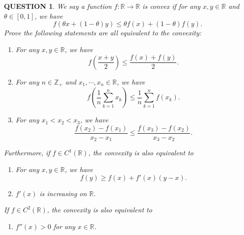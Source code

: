 \documentclass[12pt]{article}
\renewcommand{\(}{\left(}%
\renewcommand{\)}{\right)}%
\renewcommand{\[}{\left[}%
\renewcommand{\]}{\right]}%
\renewcommand{\r}{\mathbb{R}}
\newcommand{\z}{\mathbb{Z}}
\newtheorem{question}{QUESTION}[section]}
\begin{document}
\begin{question}
	We say a function $f:\r\to\r$ is convex if for any $x,y\in\r$ and $\theta\in[0,1]$, we have
	\begin{equation*}
		f(\theta x+(1-\theta)y)\leq \theta f(x)+(1-\theta)f(y).\tag{$*$}
	\end{equation*}
	Prove the following statements are all equivalent to the convexity:
	\begin{enumerate}
		\item For any $x,y\in\r$, we have
		\begin{equation*}
			f\(\frac{x+y}{2} \)\leq \frac{f(x)+f(y)}{2}.
		\end{equation*}
		\item For any $n\in\z_+$ and $x_1,\cdots,x_n\in\r$, we have
		\begin{equation*}
			f\(\frac{1}{n}\sum_{k=1}^nx_k \)\leq \frac{1}{n}\sum_{k=1}^nf(x_k).\tag{$*$}
		\end{equation*}
		\item For any $x_1<x_2<x_3$, we have
		\begin{equation*}
			\frac{f(x_2)-f(x_1)}{x_2-x_1}\leq \frac{f(x_3)-f(x_2)}{x_3-x_2}.
		\end{equation*}
		
	\end{enumerate}
	Furthermore, if $f\in C^1(\r)$, the convexity is also equivalent to
	\begin{enumerate}
		\item[4.]For any $x,y\in\r$, we have
		\begin{equation*}
			f(y)\geq f(x)+f'(x)(y-x).
		\end{equation*}
		\item[5.]$f'(x)$ is increasing on $\r$.
	\end{enumerate}
	If $f\in C^2(\r)$, the convexity is also equivalent to
	\begin{enumerate}
		\item[6.] $f''(x)>0$ for any $x\in\r$.
	\end{enumerate}
\end{question}
\end{document}
